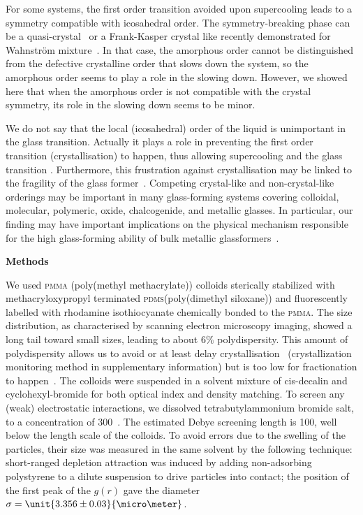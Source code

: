 For some systems, the first order transition avoided upon supercooling leads to a symmetry compatible with icosahedral order. The symmetry-breaking phase can be a quasi-crystal~\citep{Doye2003} or a Frank-Kasper crystal like recently demonstrated for Wahnstr\"om mixture~\citep{Pedersen2010}. In that case, the amorphous order cannot be distinguished from the defective crystalline order that slows down the system, so the amorphous order seems to play a role in the slowing down. However, we showed here that when the amorphous order is not compatible with the crystal symmetry, its role in the slowing down seems to be minor.

We do not say that the local (icosahedral) order of the liquid is unimportant in the glass transition. Actually it plays a role in preventing the first order transition (crystallisation) to happen, thus allowing supercooling and the glass transition \cite{TanakaMJPCM}. Furthermore, this frustration against crystallisation may be linked to the fragility of the glass former~\citep{TanakaGJPCM,tanaka2010critical}. Competing crystal-like and non-crystal-like orderings may be important in many glass-forming systems covering colloidal, molecular, polymeric, oxide, chalcogenide, and metallic glasses. In particular, our finding may have important implications on the physical mechanism responsible for the high glass-forming ability of bulk metallic glassformers~\cite{Wang2004}. 

\vspace{1cm}
\noindent
\textbf{Methods}

We used \textsc{pmma} (poly(methyl methacrylate)) colloids sterically stabilized with methacryloxypropyl terminated \textsc{pdms}(poly(dimethyl siloxane)) and fluorescently labelled with rhodamine isothiocyanate chemically bonded to the \textsc{pmma}. The size distribution, as characterised by scanning electron microscopy imaging, showed a long tail toward small sizes, leading to about $6\%$ polydispersity. This amount of polydispersity allows us to avoid or at least delay crystallisation~\cite{Zaccarelli2009} (crystallization monitoring method in supplementary information) but is too low for fractionation to happen~\citep{Fasolo2003}. The colloids were suspended in a solvent mixture of cis-decalin and cyclohexyl-bromide for both optical index and density matching. To screen any (weak) electrostatic interactions, we dissolved tetrabutylammonium bromide salt, to a concentration of \unit{300}{\nano\mole\per\liter}~\citep{royall2005}. The estimated Debye screening length is \unit{100}{\nano\metre}, well below the length scale of the colloids. To avoid errors due to the swelling of the particles, their size was measured in the same solvent by the following technique: short-ranged depletion attraction was induced by adding non-adsorbing polystyrene to a dilute suspension to drive particles into contact; the position of the first peak of the $g(r)$ gave the diameter $\sigma = \unit{3.356\pm0.03}{\micro\meter}$.

